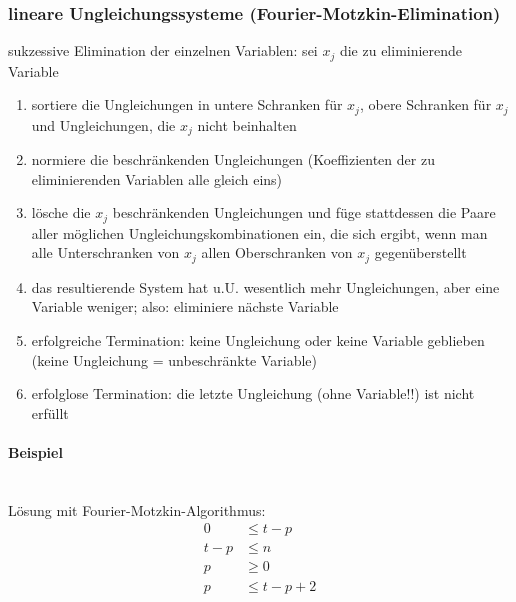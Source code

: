 \subsubsection{lineare Ungleichungssysteme (Fourier-Motzkin-Elimination)}
sukzessive Elimination der einzelnen Variablen: sei $x_j$ die zu eliminierende Variable
\begin{enumerate}
	\item sortiere die Ungleichungen in untere Schranken für $x_j$, obere Schranken für $x_j$ und Ungleichungen, die $x_j$ nicht beinhalten
	\item normiere die beschränkenden Ungleichungen (Koeffizienten der zu eliminierenden Variablen alle gleich eins)
	\item lösche die $x_j$ beschränkenden Ungleichungen und füge stattdessen die Paare aller möglichen Ungleichungskombinationen ein,
		die sich ergibt, wenn man alle Unterschranken von $x_j$ allen Oberschranken von $x_j$ gegenüberstellt
	\item das resultierende System hat u.U. wesentlich mehr Ungleichungen, aber eine Variable weniger; also: eliminiere nächste Variable
	\item erfolgreiche Termination: keine Ungleichung oder keine Variable geblieben (keine Ungleichung = unbeschränkte Variable)
	\item erfolglose Termination: die letzte Ungleichung (ohne Variable!!) ist nicht erfüllt
\end{enumerate}


\paragraph{Beispiel} ~\\
Lösung mit Fourier-Motzkin-Algorithmus:
\begin{align*}
0   & \leq t-p   \\
t-p & \leq n     \\
p   & \geq 0     \\
p   & \leq t-p+2
\end{align*}

